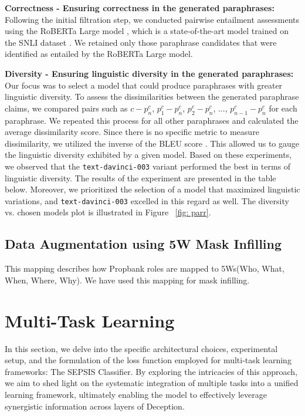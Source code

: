 \textbf{Correctness - Ensuring correctness in the generated paraphrases:} Following the initial filtration step, we conducted pairwise entailment assessments using the RoBERTa Large model \cite{liu2019roberta}, which is a state-of-the-art model trained on the SNLI dataset \cite{bowman2015large}. We retained only those paraphrase candidates that were identified as entailed by the RoBERTa Large model.


\textbf{Diversity - Ensuring linguistic diversity in the generated paraphrases:} Our focus was to select a model that could produce paraphrases with greater linguistic diversity. To assess the dissimilarities between the generated paraphrase claims, we compared pairs such as $c-p_n^c$, $p_1^c-p_n^c$, $p_2^c-p_n^c$, ..., $p_{n-1}^c-p_n^c$ for each paraphrase. We repeated this process for all other paraphrases and calculated the average dissimilarity score. Since there is no specific metric to measure dissimilarity, we utilized the inverse of the BLEU score \cite{papineni2002bleu}. This allowed us to gauge the linguistic diversity exhibited by a given model. Based on these experiments, we observed that the \texttt{text-davinci-003} variant performed the best in terms of linguistic diversity. The results of the experiment are presented in the table below. Moreover, we prioritized the selection of a model that maximized linguistic variations, and \texttt{text-davinci-003} excelled in this regard as well. The diversity vs. chosen models plot is illustrated in Figure ~\ref{fig: parr}.




\subsection{Data Augmentation using 5W Mask Infilling}
This mapping describes how Propbank roles are mapped to 5Ws(Who, What, When, Where, Why). We have used this mapping for mask infilling.



\section{Multi-Task Learning}\label{sec:MTL}

In this section, we delve into the specific architectural choices, experimental setup, and the formulation of the loss function employed for multi-task learning frameworks: The SEPSIS Classifier. By exploring the intricacies of this approach, we aim to shed light on the systematic integration of multiple tasks into a unified learning framework, ultimately enabling the model to effectively leverage synergistic information across layers of Deception. 

